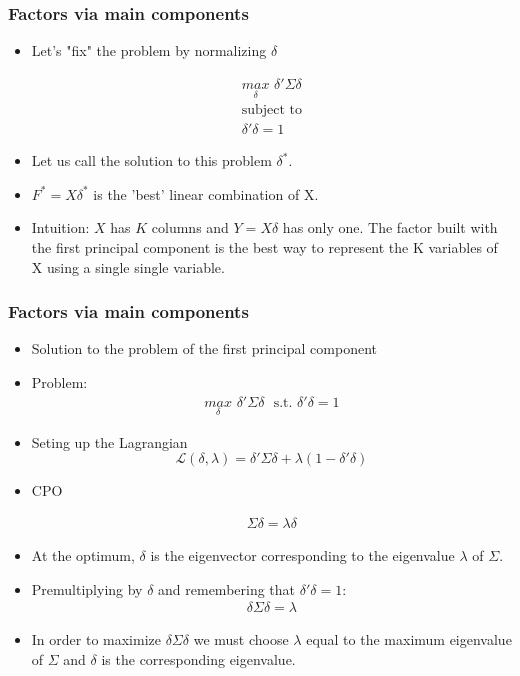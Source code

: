 \documentclass[
  shownotes,
  xcolor={svgnames},
  hyperref={colorlinks,citecolor=DarkBlue,linkcolor=DarkRed,urlcolor=DarkBlue}
  , aspectratio=169]{beamer}
\begin{document}
\begin{frame}
\frametitle{Factors via main components}

\begin{itemize}
\item Let's "fix" the problem by normalizing $\delta$

\begin{align}
\underset{\delta}{max}\,\, \delta' \Sigma \delta \\ \nonumber
\text{subject to}  \\ \nonumber
\delta' \delta = 1 \nonumber
\end{align}
\item Let us call the solution to this problem $\delta^*$. 
\medskip
\item $F^* = X\delta^*$ is the 'best' linear combination of X. 
\medskip
\item Intuition: $X$ has $K$ columns and $Y = X\delta$ has only one. The factor built with the first principal component is the best way to represent the K variables of X using a single single variable.
\end{itemize}
\end{frame}



\begin{frame}
\frametitle{Factors via main components}

\begin{itemize}


\item Solution to the problem of the first principal component
\item Problem: 
\begin{align}
\underset{\delta}{max}\,\, \delta' \Sigma \delta \,\, \text{  s.t.}  \,\, \delta' \delta = 1 \nonumber
\end{align}
\item Seting up the Lagrangian $$\mathcal{L}(\delta,\lambda) = \delta' \Sigma \delta + \lambda(1-\delta'\delta)$$

\item CPO

\begin{align}
\Sigma \delta = \lambda \delta
\end{align}

\item At the optimum, $\delta$ is the eigenvector corresponding to the eigenvalue $\lambda$ of $\Sigma$. 
\item Premultiplying by $\delta$ and  remembering that $\delta'\delta = 1$:
\begin{align}
\delta \Sigma \delta = \lambda
\end{align}
\footnotesize
\item In order to maximize $\delta \Sigma \delta $ we must choose $\lambda$ equal to the maximum eigenvalue of $\Sigma$ and $\delta$ is the corresponding eigenvalue.
\end{itemize}
\end{frame}
\end{document}
